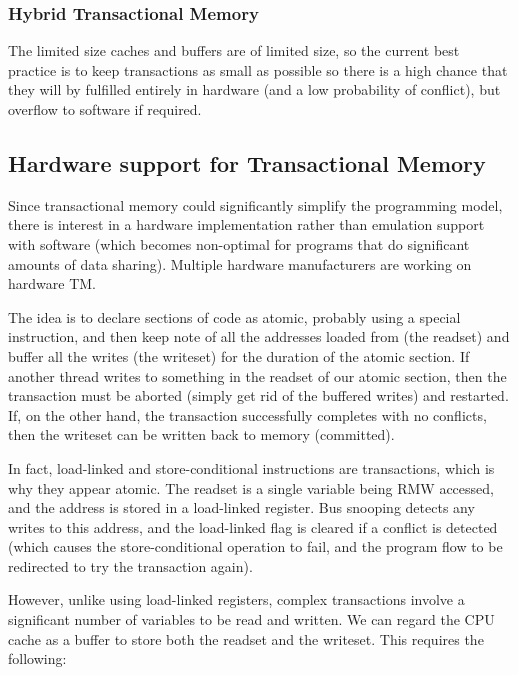 \subsubsection{Hybrid Transactional Memory}

The limited size caches and buffers are of limited size, so the
current best practice is to keep transactions as small as possible so
there is a high chance that they will by fulfilled entirely in
hardware (and a low probability of conflict), but overflow to software
if required.


\subsection{Hardware support for Transactional Memory}

Since transactional memory could significantly simplify the
programming model, there is interest in a hardware implementation
rather than emulation support with software (which becomes non-optimal
for programs that do significant amounts of data sharing). Multiple
hardware manufacturers are working on hardware TM.

The idea is to declare sections of code as atomic, probably using a
special instruction, and then keep note of all the addresses loaded
from (the readset) and buffer all the writes (the writeset) for the
duration of the atomic section. If another thread writes to something
in the readset of our atomic section, then the transaction must be
aborted (simply get rid of the buffered writes) and restarted. If, on
the other hand, the transaction successfully completes with no
conflicts, then the writeset can be written back to memory
(committed).

In fact, load-linked and store-conditional instructions are
transactions, which is why they appear atomic. The readset is a single
variable being RMW accessed, and the address is stored in a
load-linked register. Bus snooping detects any writes to this address,
and the load-linked flag is cleared if a conflict is detected (which
causes the store-conditional operation to fail, and the program flow
to be redirected to try the transaction again).

However, unlike using load-linked registers, complex transactions
involve a significant number of variables to be read and written. We
can regard the CPU cache as a buffer to store both the readset and the
writeset. This requires the following:

